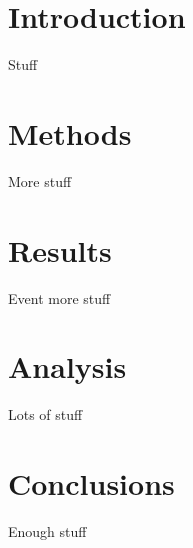 \section{Introduction}
Stuff

\section{Methods}
More stuff

\section{Results}
Event more stuff

\section{Analysis}
Lots of stuff

\section{Conclusions}
Enough stuff


